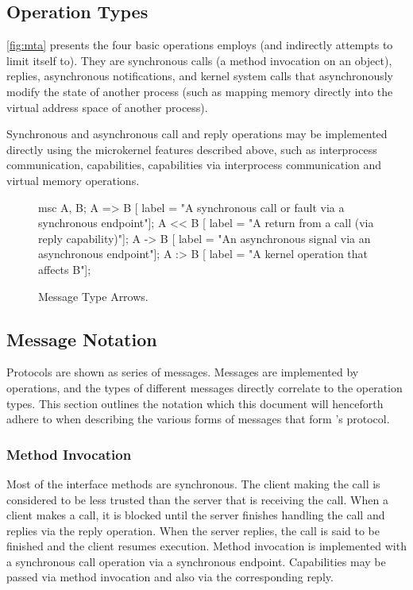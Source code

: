 \subsection{Operation Types} 

\autoref{fig:mta} presents the four basic operations  employs (and indirectly attempts to limit itself to). They are synchronous calls (a method invocation on an object), replies, asynchronous notifications, and kernel system calls that asynchronously modify the state of another process (such as mapping memory directly into the virtual address space of another process).

Synchronous and asynchronous call and reply operations may be implemented directly using the microkernel features described above, such as interprocess communication, capabilities, capabilities via interprocess communication and virtual memory operations.

\begin{figure}[htb]
  \centering
  \begin{msc}
    msc {
      A, B;
      A => B [ label = "A synchronous call or fault via a synchronous endpoint"];
      A << B [ label = "A return from a call (via reply capability)"];
      A -> B [ label = "An asynchronous signal via an asynchronous endpoint"];
      A :> B [ label = "A kernel operation that affects B"];
    }
  \end{msc}
  \caption{Message Type Arrows.}
  \label{fig:mta}
\end{figure}

\subsection{Message Notation} 
\label{mNotation}

Protocols are shown as series of messages. Messages are implemented by operations, and the types of different messages directly correlate to the operation types. This section outlines the notation which this document will henceforth adhere to when describing the various forms of messages that form 's protocol.

\subsubsection*{Method Invocation}

Most of the interface methods are synchronous. The client making the call is considered to be less trusted than the server that is receiving the call. When a client makes a call, it is blocked until the server finishes handling the call and replies via the reply operation. When the server replies, the call is said to be finished and the client resumes execution. Method invocation is implemented with a synchronous call operation via a synchronous endpoint. Capabilities may be passed via method invocation and also via the corresponding reply.

